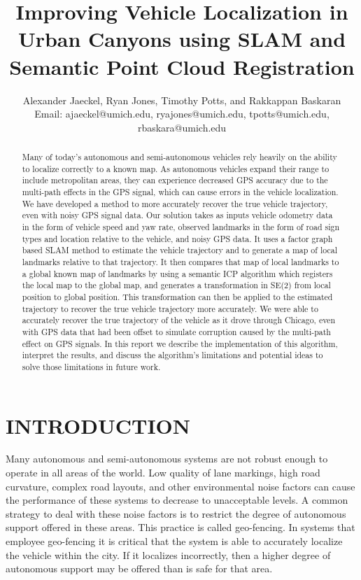 \documentclass[letterpaper, 10 pt, conference]{ieeeconf}  %
\title{\LARGE \bf
Improving Vehicle Localization in Urban Canyons using SLAM and Semantic Point Cloud Registration
}
\author{Alexander Jaeckel, Ryan Jones, Timothy Potts, and Rakkappan Baskaran\\%
Email: ajaeckel@umich.edu, ryajones@umich.edu, tpotts@umich.edu, rbaskara@umich.edu
}
\begin{document}
\maketitle
\thispagestyle{empty}
\pagestyle{empty}


\begin{abstract}

Many of today's autonomous and semi-autonomous vehicles rely heavily on the ability to localize correctly to a known map. As autonomous vehicles expand their range to include metropolitan areas, they can experience decreased GPS accuracy due to the multi-path effects in the GPS signal, which can cause errors in the vehicle localization. We have developed a method to more accurately recover the true vehicle trajectory, even with noisy GPS signal data. Our solution takes as inputs vehicle odometry data in the form of vehicle speed and yaw rate, observed landmarks in the form of road sign types and location relative to the vehicle, and noisy GPS data. It uses a factor graph based SLAM method to estimate the vehicle trajectory and to generate a map of local landmarks relative to that trajectory. It then compares that map of local landmarks to a global known map of landmarks by using a semantic ICP algorithm which registers the local map to the global map, and generates a transformation in SE(2) from local position to global position. This transformation can then be applied to the estimated trajectory to recover the true vehicle trajectory more accurately. We were able to accurately recover the true trajectory of the vehicle as it drove through Chicago, even with GPS data that had been offset to simulate corruption caused by the multi-path effect on GPS signals. In this report we describe the implementation of this algorithm, interpret the results, and discuss the algorithm's limitations and potential ideas to solve those limitations in future work.

\end{abstract}


\section{INTRODUCTION}

Many autonomous and semi-autonomous systems are not robust enough to operate in all areas of the world. Low quality of lane markings, high road curvature, complex road layouts, and other environmental noise factors can cause the performance of these systems to decrease to unacceptable levels. A common strategy to deal with these noise factors is to restrict the degree of autonomous support offered in these areas. This practice is called geo-fencing. In systems that employee geo-fencing it is critical that the system is able to accurately localize the vehicle within the city. If it localizes incorrectly, then a higher degree of autonomous support may be offered than is safe for that area. 
\end{document}
